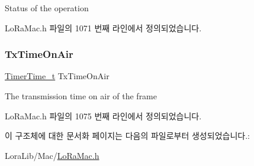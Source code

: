 Status of the operation 

Lo\+Ra\+Mac.\+h 파일의 1071 번째 라인에서 정의되었습니다.

\mbox{\label{structs_mlme_confirm_aa17a8607485db100d315e74853dd217e}} 
\subsubsection{\texorpdfstring{Tx\+Time\+On\+Air}{TxTimeOnAir}}
{\footnotesize\ttfamily \mbox{\hyperlink{utilities_8h_a4215ca43d3e953099ea758ce428599d0}{Timer\+Time\+\_\+t}} Tx\+Time\+On\+Air}

The transmission time on air of the frame 

Lo\+Ra\+Mac.\+h 파일의 1075 번째 라인에서 정의되었습니다.



이 구조체에 대한 문서화 페이지는 다음의 파일로부터 생성되었습니다.\+:\begin{DoxyCompactItemize}
\item 
Lora\+Lib/\+Mac/\mbox{\hyperlink{_lo_ra_mac_8h}{Lo\+Ra\+Mac.\+h}}\end{DoxyCompactItemize}
